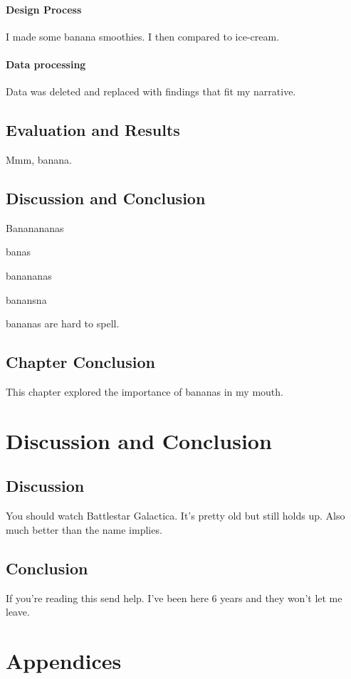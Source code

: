 \documentclass[oneside,openany]{report}
\let\Oldsection\section
\renewcommand{\section}{\FloatBarrier\Oldsection}
\begin{document}
\subsubsection{Design Process}
I made some banana smoothies. I then compared to ice-cream.

\subsubsection{Data processing}
Data was deleted and replaced with findings that fit my narrative. 

\section{Evaluation and Results}
\label{sec:chapter1_evaluation}
Mmm, banana.

\section{Discussion and Conclusion}
Bananananas

banas

banananas

banansna

bananas are hard to spell.

\section{Chapter Conclusion}
This chapter explored the importance of bananas in my mouth.

\chapter{Discussion and Conclusion}

\section{Discussion}
You should watch Battlestar Galactica. It's pretty old but still holds up. Also much better than the name implies. 

\section{Conclusion}
If you're reading this send help. I've been here 6 years and they won't let me leave.


\chapter{Appendices}
%
\end{document}
